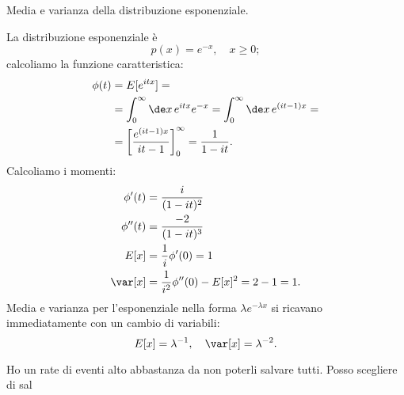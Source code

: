 \begin{exercise}
	Media e varianza della distribuzione esponenziale.
\end{exercise}

\begin{solution*}
	La distribuzione esponenziale è
	\begin{equation*}
		p(x) = e^{-x}, \quad x \ge 0;
	\end{equation*}
	calcoliamo la funzione caratteristica:
	\begin{align*}
		\phi(t) &=  E[e^{itx}] = \\
		&= \int_0^\infty \de x\, e^{itx}e^{-x} = \int_0^\infty \de x\, e^{(it-1)x} = \\
		&= \left[ \frac{e^{(it-1)x}}{it-1} \right]_0^\infty = \frac1{1-it}.
	\end{align*}
	Calcoliamo i momenti:
	\begin{align*}
		\phi'(t) &= \frac{i}{(1-it)^2} \\
		\phi''(t) &= \frac{-2}{(1-it)^3} \\
		E[x] &= \frac1i \phi'(0) = 1 \\
		\var[x] &= \frac1{i^2}\phi''(0) - E[x]^2 = 2 - 1 = 1.
	\end{align*}
	Media e varianza per l'esponenziale nella forma $\lambda e^{-\lambda x}$ si ricavano immediatamente con un cambio di variabili:
	\begin{equation*}
		E[x] = \lambda^{-1}, \quad \var[x] = \lambda^{-2}.
	\end{equation*}
\end{solution*}

\begin{exercise}
	Ho un rate di eventi alto abbastanza da non poterli salvare tutti. Posso scegliere di sal
\end{exercise}
